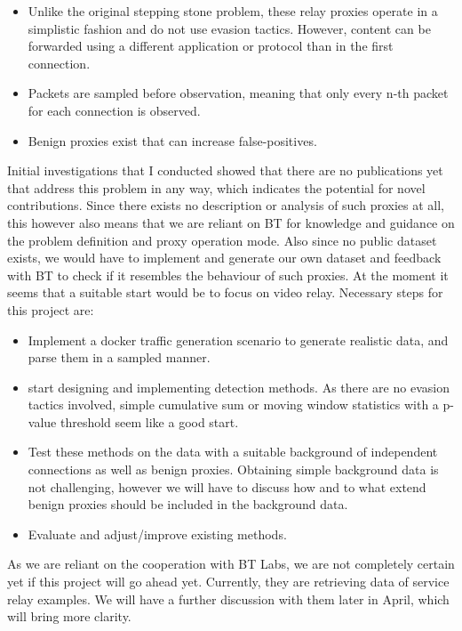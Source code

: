 \documentclass[a4paper,12pt,twoside]{article}
\begin{document}
\begin{itemize}
\item Unlike the original stepping stone problem, these relay proxies operate in a simplistic fashion and do not use evasion tactics. However, content can be forwarded using a different application or protocol than in the first connection.
\item Packets are sampled before observation, meaning that only every n-th packet for each connection is observed.
\item Benign proxies exist that can increase false-positives.
\end{itemize}

Initial investigations that I conducted showed that there are no publications yet that address this problem in any way, which indicates the potential for novel contributions. Since there exists no description or analysis of such proxies at all, this however also means that we are reliant on BT for knowledge and guidance on the problem definition and proxy operation mode. Also since no public dataset exists, we would have to implement and generate our own dataset and feedback with BT to check if it resembles the behaviour of such proxies. At the moment it seems that a suitable start would be to focus on video relay. Necessary steps for this project are:

\begin{itemize}

\item Implement a docker traffic generation scenario to generate realistic data, and parse them in a sampled manner.
\item start designing and implementing detection methods. As there are no evasion tactics involved, simple cumulative sum or moving window statistics with a p-value threshold seem like a good start.
\item Test these methods on the data with a suitable background of independent connections as well as benign proxies. Obtaining simple background data is not challenging, however we will have to discuss how and to what extend benign proxies should be included in the background data.
\item Evaluate and adjust/improve existing methods.

\end{itemize}

As we are reliant on the cooperation with BT Labs, we are not completely certain yet if this project will go ahead yet. Currently, they are retrieving data of service relay examples. We will have a further discussion with them later in April, which will bring more clarity. 
\end{document}
